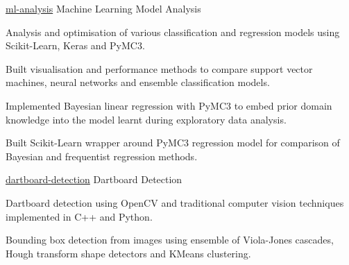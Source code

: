 \begin{cvprojects}
\cvproject
    {\href{https://github.com/kaihulme/ml-analysis}{\faGithubSquare\acvHeaderIconSep ml-analysis}} %
    {Machine Learning Model Analysis} %
    {\begin{cvitems}
        \item Analysis and optimisation of various classification and regression models using Scikit-Learn, Keras and PyMC3.
        \item Built visualisation and performance methods to compare support vector machines, neural networks and ensemble classification models.
        \item Implemented Bayesian linear regression with PyMC3 to embed prior domain knowledge into the model learnt during exploratory data analysis.
        \item Built Scikit-Learn wrapper around PyMC3 regression model for comparison of Bayesian and frequentist regression methods.
      \end{cvitems}
    }
    
\cvproject
    {\href{https://github.com/kaihulme/dartboard-detection}{\faGithubSquare\acvHeaderIconSep dartboard-detection}} %
    {Dartboard Detection} %
    {\begin{cvitems}
        \item {Dartboard detection using OpenCV and traditional computer vision techniques implemented in C++ and Python.}
        \item {Bounding box detection from images using ensemble of Viola-Jones cascades, Hough transform shape detectors and KMeans clustering.}
      \end{cvitems}
    }
    
    


\end{cvprojects}
